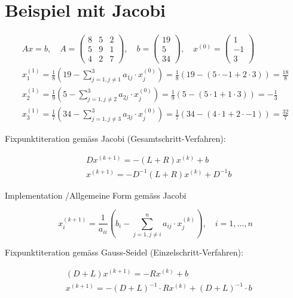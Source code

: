 \documentclass[10pt]{article}
\begin{document}
\section*{Beispiel mit Jacobi}
$$
\begin{gathered}
A x=b, \quad A=\left(\begin{array}{lll}
8 & 5 & 2 \\
5 & 9 & 1 \\
4 & 2 & 7
\end{array}\right), \quad b=\left(\begin{array}{c}
19 \\
5 \\
34
\end{array}\right), \quad x^{(0)}=\left(\begin{array}{c}
1 \\
-1 \\
3
\end{array}\right) \\
x_{1}^{(1)}=\frac{1}{8}\left(19-\sum_{j=1, j \neq 1}^{3} a_{1 j} \cdot x_{j}^{(0)}\right)=\frac{1}{8}(19-(5 \cdot-1+2 \cdot 3))=\frac{18}{8} \\
x_{2}^{(1)}=\frac{1}{9}\left(5-\sum_{j=1, j \neq 2}^{3} a_{2 j} \cdot x_{j}^{(0)}\right)=\frac{1}{9}(5-(5 \cdot 1+1 \cdot 3))=-\frac{1}{3} \\
x_{3}^{(1)}=\frac{1}{7}\left(34-\sum_{j=1, j \neq 3}^{3} a_{3 j} \cdot x_{j}^{(0)}\right)=\frac{1}{7}(34-(4 \cdot 1+2 \cdot-1))=\frac{32}{7}
\end{gathered}
$$

Fixpunktiteration gemäss Jacobi (Gesamtschritt-Verfahren):

$$
\begin{aligned}
& D x^{(k+1)}=-(L+R) x^{(k)}+b \\
& x^{(k+1)}=-D^{-1}(L+R) x^{(k)}+D^{-1} b
\end{aligned}
$$

Implementation /Allgemeine Form gemäss Jacobi

$$
x_{i}^{(k+1)}=\frac{1}{a_{i i}}\left(b_{i}-\sum_{j=1, j \neq i}^{n} a_{i j} \cdot x_{j}^{(k)}\right), \quad i=1, \ldots, n
$$

Fixpunktiteration gemäss Gauss-Seidel (Einzelschritt-Verfahren):

$$
\begin{aligned}
& (D+L) x^{(k+1)}=-R x^{(k)}+b \\
& x^{(k+1)}=-(D+L)^{-1} \cdot R x^{(k)}+(D+L)^{-1} \cdot b
\end{aligned}
$$
\end{document}
